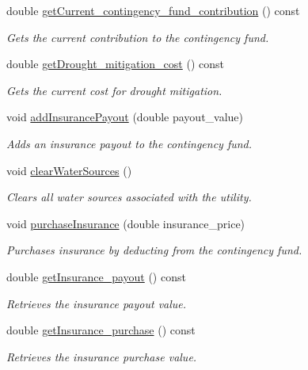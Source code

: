\begin{DoxyCompactItemize}
double \mbox{\hyperlink{classUtility_af1745fc1364e7a03dc561dd9832b7db4}{get\+Current\+\_\+contingency\+\_\+fund\+\_\+contribution}} () const
\begin{DoxyCompactList}\small\item\em Gets the current contribution to the contingency fund. \end{DoxyCompactList}\item 
double \mbox{\hyperlink{classUtility_a27dc0aeabdcb9fdb5a7d388e67e905f8}{get\+Drought\+\_\+mitigation\+\_\+cost}} () const
\begin{DoxyCompactList}\small\item\em Gets the current cost for drought mitigation. \end{DoxyCompactList}\item 
void \mbox{\hyperlink{classUtility_a2eaf70b4492ab8ec0e0420d6b7c3b821}{add\+Insurance\+Payout}} (double payout\+\_\+value)
\begin{DoxyCompactList}\small\item\em Adds an insurance payout to the contingency fund. \end{DoxyCompactList}\item 
void \mbox{\hyperlink{classUtility_aa770f28c76e84747bbd643f55dbc4dd5}{clear\+Water\+Sources}} ()
\begin{DoxyCompactList}\small\item\em Clears all water sources associated with the utility. \end{DoxyCompactList}\item 
void \mbox{\hyperlink{classUtility_a97073e3d7a30275c639484b3158284fa}{purchase\+Insurance}} (double insurance\+\_\+price)
\begin{DoxyCompactList}\small\item\em Purchases insurance by deducting from the contingency fund. \end{DoxyCompactList}\item 
double \mbox{\hyperlink{classUtility_af789e394a867f007b681c68af3fb3349}{get\+Insurance\+\_\+payout}} () const
\begin{DoxyCompactList}\small\item\em Retrieves the insurance payout value. \end{DoxyCompactList}\item 
double \mbox{\hyperlink{classUtility_aa9a26e9b3b5af555c8278330c9f4a468}{get\+Insurance\+\_\+purchase}} () const
\begin{DoxyCompactList}\small\item\em Retrieves the insurance purchase value. \end{DoxyCompactList}\item 

\end{DoxyCompactItemize}
